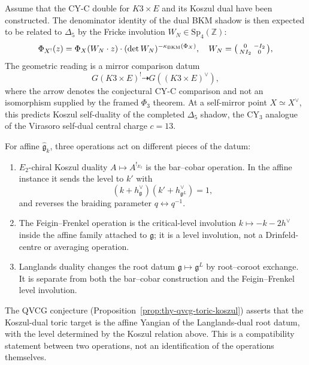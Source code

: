 \begin{conjecture}
\label{prop:thy-qvcg-k3e-koszul}
\ClaimStatusConjectured
Assume that the CY-C double for $K3\times E$ and its Koszul dual have been constructed.
The denominator identity of the dual BKM shadow is then expected to be related to $\Delta_5$ by the Fricke involution $W_N\in\mathrm{Sp}_4(\mathbb{Z})$:
\[
\Phi_{X^!}(z)=\Phi_X(W_N\cdot z)\cdot(\det W_N)^{-\kappa_{\mathrm{BKM}}(\Phi_X)},
\quad W_N=\begin{psmallmatrix}0&-I_2\\NI_2&0\end{psmallmatrix},
\]
The geometric reading is a mirror comparison datum
\[
G(K3\times E)^! \dashrightarrow G((K3\times E)^\vee),
\]
where the arrow denotes the conjectural CY-C comparison and not an isomorphism supplied by the framed $\Phi_3$ theorem.
At a self-mirror point $X\simeq X^\vee$, this predicts Koszul self-duality of the completed $\Delta_5$ shadow, the CY$_3$ analogue of the Virasoro self-dual central charge $c=13$.
\end{conjecture}

\begin{remark}
\label{rem:thy-qvcg-three-dualities}
For affine $\hat{\mathfrak g}_k$, three operations act on different
pieces of the datum:
\begin{enumerate}[label=\textup{(\roman*)}]
\item $E_2$-chiral Koszul duality $A\mapsto A^{!_{E_2}}$ is the
bar--cobar operation. In the affine instance it sends the level to
$k'$ with
\[
 (k+h^\vee_{\mathfrak g})(k'+h^\vee_{\mathfrak g^L})=1,
\]
and reverses the braiding parameter $q\leftrightarrow q^{-1}$.
\item The Feigin--Frenkel operation is the critical-level involution
$k\mapsto -k-2h^\vee$ inside the affine family attached to
$\mathfrak g$; it is a level involution, not a Drinfeld-centre or
averaging operation.
\item Langlands duality changes the root datum
$\mathfrak g\mapsto\mathfrak g^L$ by root--coroot exchange. It is
separate from both the bar--cobar construction and the
Feigin--Frenkel level involution.
\end{enumerate}
The QVCG conjecture (Proposition~\ref{prop:thy-qvcg-toric-koszul})
asserts that the Koszul-dual toric target is the affine Yangian of the
Langlands-dual root datum, with the level determined by the Koszul
relation above. This is a compatibility statement between two
operations, not an identification of the operations themselves.
\end{remark}
